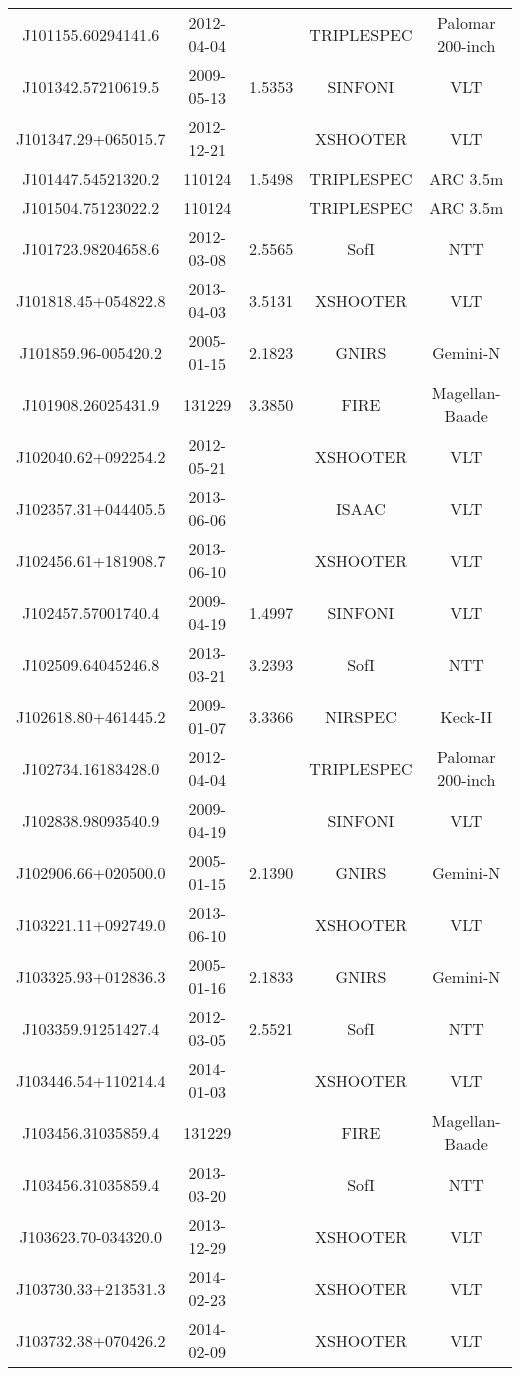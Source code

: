 {\begin{longtable}{ccccc}
J101155.60294141.6 & 2012-04-04 &  & TRIPLESPEC & Palomar 200-inch \\
J101342.57210619.5 & 2009-05-13 & 1.5353 & SINFONI & VLT \\
J101347.29+065015.7 & 2012-12-21 &  & XSHOOTER & VLT \\
J101447.54521320.2 & 110124 & 1.5498 & TRIPLESPEC & ARC 3.5m \\
J101504.75123022.2 & 110124 &  & TRIPLESPEC & ARC 3.5m \\
J101723.98204658.6 & 2012-03-08 & 2.5565 & SofI & NTT \\
J101818.45+054822.8 & 2013-04-03 & 3.5131 & XSHOOTER & VLT \\
J101859.96-005420.2 & 2005-01-15 & 2.1823 & GNIRS & Gemini-N \\
J101908.26025431.9 & 131229 & 3.3850 & FIRE & Magellan-Baade \\
J102040.62+092254.2 & 2012-05-21 &  & XSHOOTER & VLT \\
J102357.31+044405.5 & 2013-06-06 &  & ISAAC & VLT \\
J102456.61+181908.7 & 2013-06-10 &  & XSHOOTER & VLT \\
J102457.57001740.4 & 2009-04-19 & 1.4997 & SINFONI & VLT \\
J102509.64045246.8 & 2013-03-21 & 3.2393 & SofI & NTT \\
J102618.80+461445.2 & 2009-01-07 & 3.3366 & NIRSPEC & Keck-II \\
J102734.16183428.0 & 2012-04-04 &  & TRIPLESPEC & Palomar 200-inch \\
J102838.98093540.9 & 2009-04-19 &  & SINFONI & VLT \\
J102906.66+020500.0 & 2005-01-15 & 2.1390 & GNIRS & Gemini-N \\
J103221.11+092749.0 & 2013-06-10 &  & XSHOOTER & VLT \\
J103325.93+012836.3 & 2005-01-16 & 2.1833 & GNIRS & Gemini-N \\
J103359.91251427.4 & 2012-03-05 & 2.5521 & SofI & NTT \\
J103446.54+110214.4 & 2014-01-03 &  & XSHOOTER & VLT \\
J103456.31035859.4 & 131229 &  & FIRE & Magellan-Baade \\
J103456.31035859.4 & 2013-03-20 &  & SofI & NTT \\
J103623.70-034320.0 & 2013-12-29 &  & XSHOOTER & VLT \\
J103730.33+213531.3 & 2014-02-23 &  & XSHOOTER & VLT \\
J103732.38+070426.2 & 2014-02-09 &  & XSHOOTER & VLT \\

\end{longtable}}

